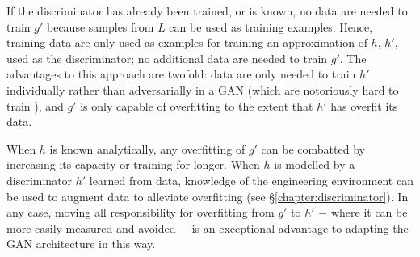 \documentclass[../../main.tex]{subfiles}
\begin{document}
If the discriminator has already been trained, or is known, no data are needed to train $g'$ because samples from $L$ can be used as training examples.
Hence, training data are only used as examples for training an approximation of $h$, $h'$, used as the discriminator; no additional data are needed to train $g'$.
The advantages to this approach are twofold: data are only needed to train $h'$ individually rather than adversarially in a GAN (which are notoriously hard to train \cite{bang18}), and $g'$ is only capable of overfitting to the extent that $h'$ has overfit its data.

When $h$ is known analytically, any overfitting of $g'$ can be combatted by increasing its capacity or training for longer.
When $h$ is modelled by a discriminator $h'$ learned from data, knowledge of the engineering environment can be used to augment data to alleviate overfitting (see \S\ref{chapter:discriminator}).
In any case, moving all responsibility for overfitting from $g'$ to $h'$ $-$ where it can be more easily measured and avoided $-$ is an exceptional advantage to adapting the GAN architecture in this way.
\end{document}
